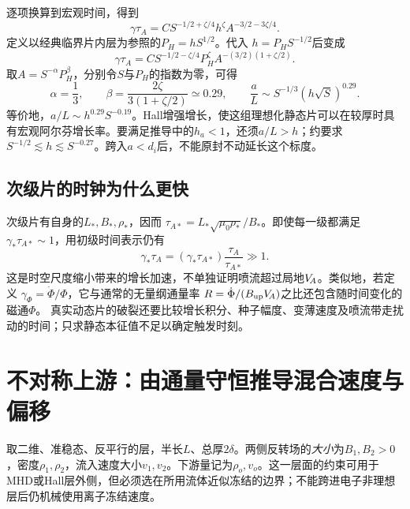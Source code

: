 逐项换算到宏观时间，得到
\begin{equation}
 \gamma\tau_A=C S^{-1/2+\zeta/4}h^{\zeta}
 A^{-3/2-3\zeta/4}.
\end{equation}
定义以经典临界片内层为参照的$P_H=hS^{1/2}$。代入
$h=P_HS^{-1/2}$后变成
\begin{equation}
 \gamma\tau_A=C S^{-1/2-\zeta/4}P_H^\zeta
 A^{-(3/2)(1+\zeta/2)}.
\end{equation}
取$A=S^{-\alpha}P_H^\beta$，分别令$S$与$P_H$的指数为零，可得
\begin{equation}
 \alpha=\frac13,\qquad
 \beta=\frac{2\zeta}{3(1+\zeta/2)}\simeq0.29,
 \qquad
 \boxed{\frac{a}{L}\sim S^{-1/3}(h\sqrt S)^{0.29}}.
\end{equation}
等价地，$a/L\sim h^{0.29}S^{-0.19}$。Hall增强增长，使这组理想化静态片可以在较厚时具有宏观阿尔芬增长率。要满足推导中的$h_a<1$，还须$a/L>h$；约要求
$S^{-1/2}\lesssim h\lesssim S^{-0.27}$。跨入$a<d_i$后，不能原封不动延长这个标度。

\subsection{次级片的时钟为什么更快}
次级片有自身的$L_*,B_*,\rho_*$，因而
$\tau_{A*}=L_*\sqrt{\mu_0\rho_*}/B_*$。即使每一级都满足
$\gamma_*\tau_{A*}\sim1$，用初级时间表示仍有
\begin{equation}
 \gamma_*\tau_A=(\gamma_*\tau_{A*})\frac{\tau_A}{\tau_{A*}}\gg1.
\end{equation}
这是时空尺度缩小带来的增长加速，不单独证明喷流超过局地$V_{\!A}$。类似地，若定义
$\gamma_\Phi=\dot\Phi/\Phi$，它与通常的无量纲通量率
$R=\dot\Phi/(B_{\rm up}V_{\!A})$之比还包含随时间变化的磁通$\Phi$。
真实动态片的破裂还要比较增长积分、种子幅度、变薄速度及喷流带走扰动的时间；只求静态本征值不足以确定触发时刻。

\section{不对称上游：由通量守恒推导混合速度与偏移}
取二维、准稳态、反平行的层，半长$L$、总厚$2\delta$。两侧反转场的\emph{大小}为$B_1,B_2>0$，密度$\rho_1,\rho_2$，流入速度大小$v_1,v_2$。下游量记为$\rho_o,v_o$。这一层面的约束可用于MHD或Hall层外侧，但必须选在所用流体近似冻结的边界；不能跨进电子非理想层后仍机械使用离子冻结速度。\citep{Cassak2007,Cassak2008}

